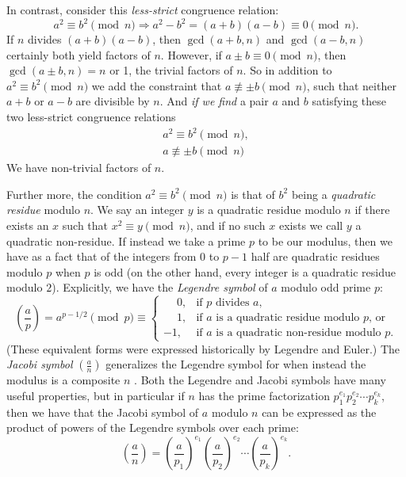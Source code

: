 \documentclass{report}
\begin{document}
In contrast, consider this \emph{less-strict} congruence relation:
\[
    a^2 \equiv b^2 \pmod n
    \Rightarrow
    a^2-b^2 = (a+b)(a-b) \equiv 0 \pmod n.
\]
If $n$ divides $(a+b)(a-b)$, then $\gcd(a+b,n)$ and $\gcd(a-b,n)$ certainly both yield factors of
$n$. However, if $a\pm b\equiv 0\pmod n$, then $\gcd(a\pm b,n)=n$ or 1, the trivial factors of $n$.
So in addition to $a^2\equiv b^2\pmod n$ we add the constraint that $a\not\equiv\pm b\pmod n$, such
that neither $a+b$ or $a-b$ are divisible by $n$. And \emph{if we find} a pair $a$ and $b$
satisfying these two less-strict congruence relations
\begin{gather}
    a^2 \equiv b^2 \pmod n, \label{eq:square-congruence1} \\
    a \not\equiv \pm b \pmod n \label{eq:square-congruence2}
\end{gather}
We have non-trivial factors of $n$.

Further more, the condition $a^2\equiv b^2\pmod n$ is that of $b^2$ being a \emph{quadratic residue}
modulo $n$. We say an integer $y$ is a quadratic residue modulo $n$ if there exists an $x$ such that
$x^2\equiv y\pmod n$, and if no such $x$ exists we call $y$ a quadratic non-residue.
If instead we take a prime $p$ to be our modulus, then we have as a fact
that of the integers from $0$ to $p-1$ half are quadratic residues modulo $p$ when $p$ is odd
(on the other hand, every integer is a quadratic residue modulo $2$).
Explicitly, we have the \emph{Legendre symbol} of $a$ modulo odd prime $p$:
\begin{equation}
    \left(\frac{a}{p}\right)
    = a^{p-1/2}\pmod p
    \equiv \begin{cases}
        \phantom{-}0, & \text{if $p$ divides $a$,} \\
        \phantom{-}1, & \text{if $a$ is a quadratic residue modulo $p$, or} \\
        -1, & \text{if $a$ is a quadratic non-residue modulo $p$.}
    \end{cases}
\end{equation}
(These equivalent forms were expressed historically by Legendre and Euler.)
The \emph{Jacobi symbol} $\left(\frac{a}{n}\right)$ generalizes the Legendre symbol for
when instead the modulus is a composite $n$
\cite{textbook}.
Both the Legendre and Jacobi symbols have many
useful properties, but in particular if $n$ has the prime factorization
$p_1^{e_1}p_2^{e_2}\cdots p_k^{e_k}$, then we have that the Jacobi symbol of $a$ modulo $n$
can be expressed as the product of powers of the Legendre symbols over each prime:
\begin{equation}
    \left(\frac{a}{n}\right) =
    {\left(\frac{a}{p_1}\right)}^{e_1}
    {\left(\frac{a}{p_2}\right)}^{e_2}
    \cdots
    {\left(\frac{a}{p_k}\right)}^{e_k}.
\end{equation}
\end{document}

